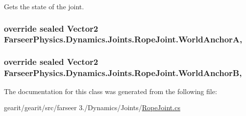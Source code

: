 Gets the state of the joint. 

\hypertarget{class_farseer_physics_1_1_dynamics_1_1_joints_1_1_rope_joint_a49ea5fcddd32174e4170ce8346ca8ff0}{
\subsubsection[{World\+Anchor\+A}]{\setlength{\rightskip}{0pt plus 5cm}override sealed Vector2 Farseer\+Physics.\+Dynamics.\+Joints.\+Rope\+Joint.\+World\+Anchor\+A\hspace{0.3cm}{\ttfamily [get]}, {\ttfamily [set]}}}\label{class_farseer_physics_1_1_dynamics_1_1_joints_1_1_rope_joint_a49ea5fcddd32174e4170ce8346ca8ff0}
\hypertarget{class_farseer_physics_1_1_dynamics_1_1_joints_1_1_rope_joint_a6575449f9b5d1775d3e23b8251e1c1cd}{
\subsubsection[{World\+Anchor\+B}]{\setlength{\rightskip}{0pt plus 5cm}override sealed Vector2 Farseer\+Physics.\+Dynamics.\+Joints.\+Rope\+Joint.\+World\+Anchor\+B\hspace{0.3cm}{\ttfamily [get]}, {\ttfamily [set]}}}\label{class_farseer_physics_1_1_dynamics_1_1_joints_1_1_rope_joint_a6575449f9b5d1775d3e23b8251e1c1cd}


The documentation for this class was generated from the following file\+:\begin{DoxyCompactItemize}
\item 
gearit/gearit/src/farseer 3./\+Dynamics/\+Joints/\hyperlink{_rope_joint_8cs}{Rope\+Joint.\+cs}\end{DoxyCompactItemize}
